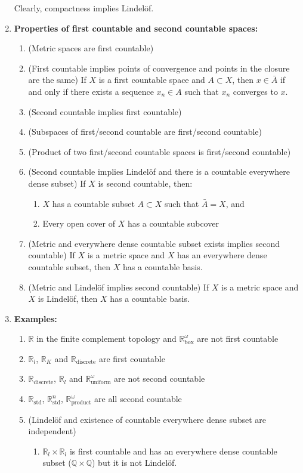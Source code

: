 \documentclass[letterpaper, 12pt]{article}
\newcommand{\RR}{\mathbb{R}}
\newcommand{\QQ}{\mathbb{Q}}
\begin{document}
\begin{enumerate}[resume]
    Clearly, compactness implies Lindel\"of.
    \item \textbf{Properties of first countable and second countable spaces:}
    \begin{enumerate}
        \item (Metric spaces are first countable)
        \item (First countable implies points of convergence and points in the closure are the same) If $X$ is a first countable space and $A\subset X$, then $x\in \bar{A}$ if and only if there exists a sequence $x_n\in A$ such that $x_n$ converges to $x$.
        \item (Second countable implies first countable)
        \item (Subspaces of first/second countable are first/second countable)
        \item (Product of two first/second countable spaces is first/second countable)
        \item (Second countable implies Lindel\"of and there is a countable everywhere dense subset) If $X$ is second countable, then:
        \begin{enumerate}
            \item $X$ has a countable subset $A\subset X$ such that $\bar{A} = X$, and
            \item Every open cover of $X$ has a countable subcover
        \end{enumerate}
        \item (Metric and everywhere dense countable subset exists implies second countable) If $X$ is a metric space and $X$ has an everywhere dense countable subset, then $X$ has a countable basis.
        \item (Metric and Lindel\"of implies second countable) If $X$ is a metric space and $X$ is Lindel\"of, then $X$ has a countable basis.
    \end{enumerate}
    \item \textbf{Examples:}
    \begin{enumerate}
        \item $\RR$ in the finite complement topology and $\RR^\omega_\text{box}$ are not first countable
        \item $\RR_l$, $\RR_K$ and $\RR_\text{discrete}$ are first countable
        \item $\RR_\text{discrete}$, $\RR_l$ and $\RR^\omega_\text{uniform}$ are not second countable
        \item $\RR_\text{std}$, $\RR^n_\text{std}$, $\RR^\omega_\text{product}$ are all second countable
        \item (Lindel\"of and existence of countable everywhere dense subset are independent)
        \begin{enumerate}
            \item $\RR_l\times\RR_l$ is first countable and has an everywhere dense countable subset ($\QQ\times\QQ$) but it is not Lindel\"of.


\end{enumerate}
\end{enumerate}
\end{enumerate}
\end{document}

